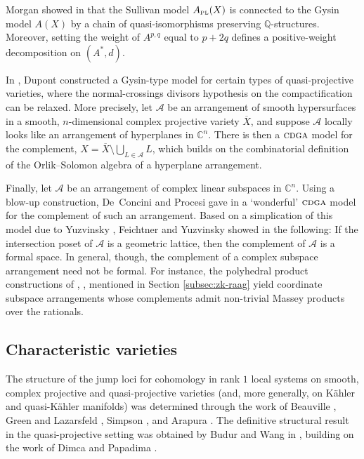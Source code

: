 \documentclass{article}
\numberwithin{equation}{section}
\theoremstyle{definition}
\newcommand{\Q}{\mathbb{Q}}
\renewcommand{\C}{\mathbb{C}}
\newcommand{\A}{{\mathcal{A}}}
\newcommand{\cdga}{\ensuremath{\textsc{cdga}}}
\newcommand{\apl}{A_{\scriptscriptstyle{{\rm PL}}}}
\begin{document}
Morgan showed in \cite{Mo} that the Sullivan model $\apl (X)$ 
is connected to the Gysin model $A(X)$ by a chain  
of quasi-isomorphisms preserving $\Q$-structures. 
Moreover, setting the weight of $A^{p,q}$ equal to $p+2q$ defines a 
positive-weight decomposition on $(A^{*}, d)$. 

In \cite{Dp15}, Dupont constructed a Gysin-type model for certain types 
of quasi-projective varieties, where the normal-crossings divisors 
hypothesis on the compactification can be relaxed. More precisely, 
let $\A$ be an arrangement of smooth hypersurfaces in a smooth, 
$n$-dimensional complex projective variety $\overline{X}$, 
and suppose $\A$ locally looks like an arrangement of 
hyperplanes in $\C^n$.  There is then a $\cdga$ model 
for the complement, $X=\overline{X}\setminus \bigcup_{L\in \A} L$, 
which builds on the combinatorial definition of the 
Orlik--Solomon algebra of a hyperplane arrangement.

Finally, let $\A$ be an arrangement of complex linear 
subspaces in $\C^n$.  Using a blow-up construction, De~Concini 
and Procesi gave in \cite{DP95} a `wonderful' $\cdga$ model for 
the complement of such an arrangement. Based on a simplication 
of this model due to Yuzvinsky \cite{Yu}, Feichtner and Yuzvinsky 
showed in \cite{FeYu} the following:  If the intersection poset of $\A$ 
is a geometric lattice, then the complement of $\A$ is a formal space. 
In general, though, the complement of a complex subspace arrangement 
need not be formal.  For instance, the polyhedral product constructions 
of \cite{Baskakov}, \cite{DeS07}, \cite{GL21} mentioned in 
Section \ref{subsec:zk-raag} yield coordinate subspace 
arrangements whose complements admit non-trivial Massey 
products over the rationals. 

\subsection{Characteristic varieties}
\label{subsec:cv qproj} 

The structure of the jump loci for cohomology in rank $1$ local systems 
on smooth, complex projective and quasi-projective varieties (and, more 
generally, on K\"{a}hler and quasi-K\"{a}hler manifolds) was determined 
through the work of Beauville \cite{Be92},  Green and 
Lazarsfeld \cite{GL87}, Simpson \cite{Si93}, and Arapura \cite{Ar}.  
The definitive structural result in the quasi-projective setting 
was obtained by Budur and Wang in \cite{BW-asens}, 
building on the work of Dimca and Papadima \cite{DP-ccm}. 
\end{document}
